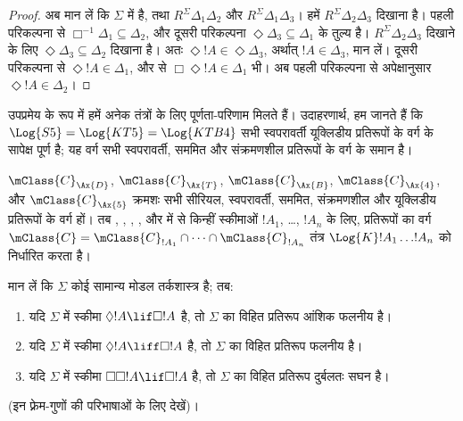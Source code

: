 \documentclass[../../../include/open-logic-section]{subfiles}
\begin{document}
\begin{proof}
  अब मान लें कि $\Sigma$ में  है, तथा $R^\Sigma
  \Delta_1\Delta_2$ और $R^\Sigma \Delta_1\Delta_3$। हमें $R^\Sigma
  \Delta_2\Delta_3$ दिखाना है। पहली परिकल्पना से $\Box^{-1}\Delta_1
  \subseteq \Delta_2$, और दूसरी परिकल्पना
  $\Diamond\Delta_3 \subseteq \Delta_1$ के तुल्य है। $R^\Sigma
  \Delta_2\Delta_3$ दिखाने के लिए
  $\Diamond\Delta_3 \subseteq \Delta_2$ दिखाना है। अतः $\Diamond!A \in
  \Diamond\Delta_3$, अर्थात् $!A \in \Delta_3$, मान लें। दूसरी परिकल्पना
  से $\Diamond!A \in \Delta_1$, और  से $\Box\Diamond!A \in
  \Delta_1$ भी। अब पहली परिकल्पना से अपेक्षानुसार $\Diamond!A \in
  \Delta_2$।
  \end{proof}

उपप्रमेय के रूप में हमें अनेक तंत्रों के लिए पूर्णता-परिणाम मिलते हैं।
उदाहरणार्थ, हम जानते हैं कि $\Log{S5} = \Log{KT5} = \Log{KTB4}$ सभी
स्वपरावर्ती यूक्लिडीय प्रतिरूपों के वर्ग के सापेक्ष पूर्ण है; यह वर्ग सभी
स्वपरावर्ती, सममित और संक्रमणशील प्रतिरूपों के वर्ग के समान है।

\begin{thm}
  $\mClass{C}_\Ax{D}$, $\mClass{C}_\Ax{T}$,
  $\mClass{C}_\Ax{B}$, $\mClass{C}_\Ax{4}$, और
  $\mClass{C}_\Ax{5}$ क्रमशः सभी सीरियल, स्वपरावर्ती, सममित,
  संक्रमणशील और यूक्लिडीय प्रतिरूपों के वर्ग हों। तब , ,
  , , और  में से किन्हीं स्कीमाओं $!A_1$, \dots,
  $!A_n$ के लिए, प्रतिरूपों का वर्ग $\mClass{C} =
  \mClass{C}_{!A_1} \cap \dots \cap \mClass{C}_{!A_n}$ तंत्र
  $\Log{K}!A_1 \dots !A_n$ को निर्धारित करता है।
\end{thm}

\begin{prop}
  मान लें कि $\Sigma$ कोई सामान्य मोडल तर्कशास्त्र है; तब:
  \begin{enumerate}
  \item{}%
    यदि $\Sigma$ में स्कीमा $\Diamond!A \lif \Box !A$ है, तो $\Sigma$
    का विहित प्रतिरूप आंशिक फलनीय है।
  \item यदि $\Sigma$ में स्कीमा $\Diamond!A \liff \Box !A$ है, तो
    $\Sigma$ का विहित प्रतिरूप फलनीय है।
  \item यदि $\Sigma$ में स्कीमा $\Box\Box!A \lif \Box !A$ है, तो
    $\Sigma$ का विहित प्रतिरूप दुर्बलतः सघन है।
  \end{enumerate}
(इन फ़्रेम-गुणों की परिभाषाओं के लिए
   देखें)।
\end{prop}
\end{document}
